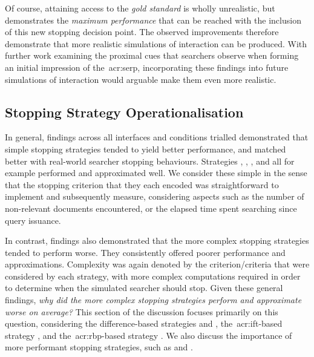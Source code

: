 Of course, attaining access to the \emph{gold standard} is wholly unrealistic, but demonstrates the \emph{maximum performance} that can be reached with the inclusion of this new stopping decision point. The observed improvements therefore demonstrate that more realistic simulations of interaction can be produced. With further work examining the proximal cues that searchers observe when forming an initial impression of the~\gls{acr:serp}, incorporating these findings into future simulations of interaction would arguable make them even more realistic.

\subsection{Stopping Strategy Operationalisation}\label{sec:conclusions:discussion:strategies}
In general, findings across all interfaces and conditions trialled demonstrated that simple stopping strategies tended to yield better performance, and matched better with real-world searcher stopping behaviours. Strategies , , ,  and  all for example performed and approximated well. We consider these simple in the sense that the stopping criterion that they each encoded was straightforward to implement and subsequently measure, considering aspects such as the number of non-relevant documents encountered, or the elapsed time spent searching since query issuance.

In contrast, findings also demonstrated that the more complex stopping strategies tended to perform worse. They consistently offered poorer performance and approximations. Complexity was again denoted by the criterion/criteria that were considered by each strategy, with more complex computations required in order to determine when the simulated searcher should stop. Given these general findings, \emph{why did the more complex stopping strategies perform and approximate worse on average?} This section of the discussion focuses primarily on this question, considering the difference-based strategies  and , the~\gls{acr:ift}-based strategy , and the~\gls{acr:rbp}-based strategy . We also discuss the importance of more performant stopping strategies, such as  and .

